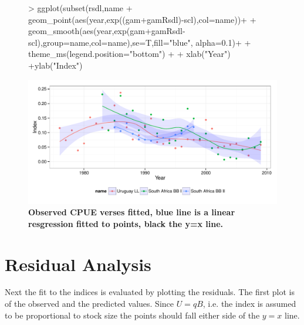 \documentclass[shortnames,nojss,article]{jss}
\begin{document}
\begin{figure}\begin{center}
\begin{Schunk}
\begin{Sinput}
>     ggplot(subset(rsdl,name %
+             geom_point(aes(year,exp((gam+gamRsdl)-scl),col=name))+
+              geom_smooth(aes(year,exp(gam+gamRsdl-scl),group=name,col=name),se=T,fill="blue", alpha=0.1)+
+              theme_ms(legend.position="bottom")  +
+              xlab("Year") +ylab("Index")
\end{Sinput}
\end{Schunk}
\includegraphics{diags-017}
\caption{\bf{Observed CPUE verses fitted, blue line is a linear resgression fitted to points, black the y=x line.}}
\label{cpue:5}
\end{center}
\end{figure}

\clearpage
\section{Residual Analysis}

Next the fit to the indices is evaluated by plotting the residuals. The first plot is of the observed and the predicted values. Since $U=qB$, i.e. the index is assumed to be proportional to stock size the points should fall either side of the $y=x$ line.    
\end{document}
